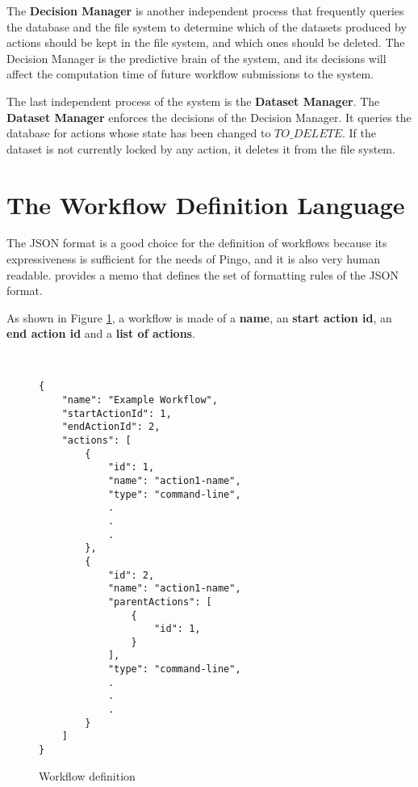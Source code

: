 The \textbf{Decision Manager} is another independent process that frequently queries the database and the file system to determine which of the datasets produced by actions should be kept in the file system, and which ones should be deleted. The Decision Manager is the predictive brain of the system, and its decisions will affect the computation time of future workflow submissions to the system.

The last independent process of the system is the \textbf{Dataset Manager}.  The \textbf{Dataset Manager} enforces the decisions of the Decision Manager.  It queries the database for actions whose state has been changed to $TO\_DELETE$. If the dataset is not currently locked by any action, it deletes it from the file system.

\section{The Workflow Definition Language}
 The JSON format is a good choice for the definition of workflows because its expressiveness is sufficient for the needs of Pingo, and it is also very human readable. \cite{bray2014javascript} provides a memo that defines the set of formatting rules of the JSON format.
 
 As shown in Figure \ref{fig:workflow_definition_language}, a workflow is made of a \textbf{name}, an \textbf{start action id}, an \textbf{end action id} and a \textbf{list of actions}. 

\begin{figure}
\begin{mdframed}
\begin{singlespace}
\begin{verbatim}


{
    "name": "Example Workflow",
    "startActionId": 1,
    "endActionId": 2,
    "actions": [
        {
            "id": 1,
            "name": "action1-name",
            "type": "command-line",
            .
            .
            .
        },
        {
            "id": 2,
            "name": "action1-name",
            "parentActions": [
                { 
                    "id": 1,
                }
            ],
            "type": "command-line",
            .
            .
            .
        }
    ]
}
\end{verbatim}
\end{singlespace}
\end{mdframed}
\caption{Workflow definition}
\label{fig:workflow_definition_language}
\end{figure}

